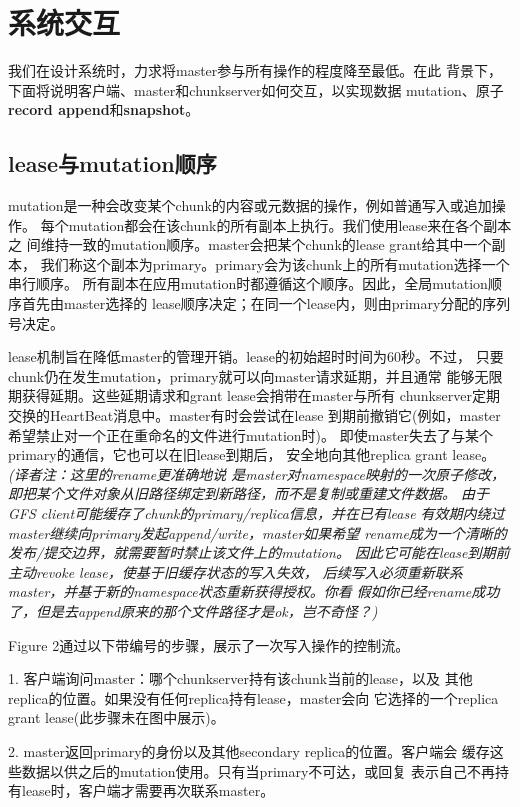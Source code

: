\section{系统交互}
我们在设计系统时，力求将master参与所有操作的程度降至最低。在此
背景下，下面将说明客户端、master和chunkserver如何交互，以实现数据
mutation、原子\textbf{record append}和\textbf{snapshot}。

\subsection{lease与mutation顺序}
mutation是一种会改变某个chunk的内容或元数据的操作，例如普通写入或追加操作。
每个mutation都会在该chunk的所有副本上执行。我们使用lease来在各个副本之
间维持一致的mutation顺序。master会把某个chunk的lease grant给其中一个副本，
我们称这个副本为primary。primary会为该chunk上的所有mutation选择一个串行顺序。
所有副本在应用mutation时都遵循这个顺序。因此，全局mutation顺序首先由master选择的
lease顺序决定；在同一个lease内，则由primary分配的序列号决定。

lease机制旨在降低master的管理开销。lease的初始超时时间为60秒。不过，
只要chunk仍在发生mutation，primary就可以向master请求延期，并且通常
能够无限期获得延期。这些延期请求和grant lease会捎带在master与所有
chunkserver定期交换的HeartBeat消息中。master有时会尝试在lease
到期前撤销它(例如，master希望禁止对一个正在重命名的文件进行mutation时)。
即使master失去了与某个primary的通信，它也可以在旧lease到期后，
安全地向其他replica grant lease。\emph{(译者注：这里的rename更准确地说
是master对namespace映射的一次原子修改，
即把某个文件对象从旧路径绑定到新路径，而不是复制或重建文件数据。
由于GFS client可能缓存了chunk的primary/replica信息，并在已有lease
有效期内绕过master继续向primary发起append/write，master如果希望
rename成为一个清晰的发布/提交边界，就需要暂时禁止该文件上的mutation。
因此它可能在lease到期前主动revoke lease，使基于旧缓存状态的写入失效，
后续写入必须重新联系master，并基于新的namespace状态重新获得授权。你看
假如你已经rename成功了，但是去append原来的那个文件路径才是ok，岂不奇怪？)}

Figure 2通过以下带编号的步骤，展示了一次写入操作的控制流。

1. 客户端询问master：哪个chunkserver持有该chunk当前的lease，以及
   其他replica的位置。如果没有任何replica持有lease，master会向
   它选择的一个replica grant lease(此步骤未在图中展示)。

2. master返回primary的身份以及其他secondary replica的位置。客户端会
   缓存这些数据以供之后的mutation使用。只有当primary不可达，或回复
   表示自己不再持有lease时，客户端才需要再次联系master。

